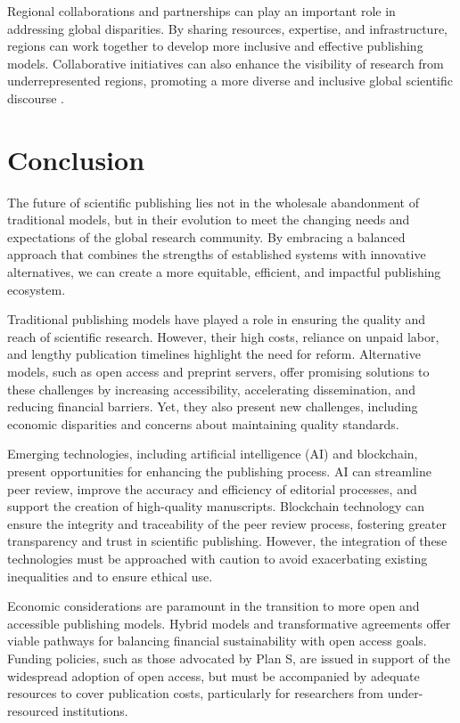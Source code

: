 \documentclass{article}
\begin{document}
Regional collaborations and partnerships can play an important  role in addressing global disparities. By sharing resources, expertise, and infrastructure, regions can work together to develop more inclusive and effective publishing models. Collaborative initiatives can also enhance the visibility of research from underrepresented regions, promoting a more diverse and inclusive global scientific discourse \cite{shearer2015fostering}.


\section{Conclusion}
The future of scientific publishing lies not in the wholesale abandonment of traditional models, but in their evolution to meet the changing needs and expectations of the global research community. By embracing a balanced approach that combines the strengths of established systems with innovative alternatives, we can create a more equitable, efficient, and impactful publishing ecosystem.

Traditional publishing models have played a role in ensuring the quality and reach of scientific research. However, their high costs, reliance on unpaid labor, and lengthy publication timelines highlight the need for reform. Alternative models, such as open access and preprint servers, offer promising solutions to these challenges by increasing accessibility, accelerating dissemination, and reducing financial barriers. Yet, they also present new challenges, including  economic disparities and concerns about maintaining quality standards.

Emerging technologies, including artificial intelligence (AI) and blockchain, present opportunities for enhancing the publishing process. AI can streamline peer review, improve the accuracy and efficiency of editorial processes, and support the creation of high-quality manuscripts. Blockchain technology can ensure the integrity and traceability of the peer review process, fostering greater transparency and trust in scientific publishing. However, the integration of these technologies must be approached with caution to avoid exacerbating existing inequalities and to ensure ethical use.

Economic considerations are paramount in the transition to more open and accessible publishing models. Hybrid models and transformative agreements offer viable pathways for balancing financial sustainability with open access goals. Funding policies, such as those advocated by Plan S, are issued in support of the widespread adoption of open access, but must be accompanied by adequate resources to cover publication costs, particularly for researchers from under-resourced institutions.
\end{document}
